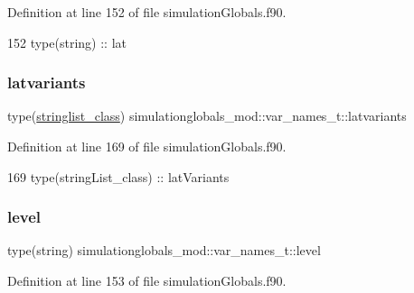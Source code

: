 Definition at line 152 of file simulation\+Globals.\+f90.


\begin{DoxyCode}
152         \textcolor{keywordtype}{type}(string) :: lat
\end{DoxyCode}
\mbox{\label{structsimulationglobals__mod_1_1var__names__t_a7cd8cf017ecfa616f6700b86361b9b1f}} 
\subsubsection{\texorpdfstring{latvariants}{latvariants}}
{\footnotesize\ttfamily type(\mbox{\hyperlink{structsimulationglobals__mod_1_1stringlist__class}{stringlist\+\_\+class}}) simulationglobals\+\_\+mod\+::var\+\_\+names\+\_\+t\+::latvariants\hspace{0.3cm}{\ttfamily [private]}}



Definition at line 169 of file simulation\+Globals.\+f90.


\begin{DoxyCode}
169         \textcolor{keywordtype}{type}(stringList\_class) :: latVariants
\end{DoxyCode}
\mbox{\label{structsimulationglobals__mod_1_1var__names__t_a1dc8ae36a22bfd43a9f1fd7e2d13548a}} 
\subsubsection{\texorpdfstring{level}{level}}
{\footnotesize\ttfamily type(string) simulationglobals\+\_\+mod\+::var\+\_\+names\+\_\+t\+::level\hspace{0.3cm}{\ttfamily [private]}}



Definition at line 153 of file simulation\+Globals.\+f90.


